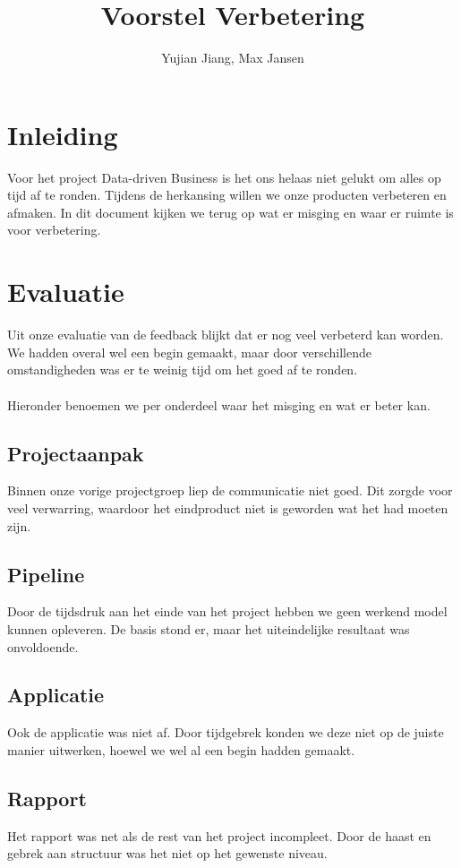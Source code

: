 \documentclass{article}
\title{Voorstel Verbetering}
\author{Yujian Jiang, Max Jansen}
\begin{document}
\maketitle

\newpage
\tableofcontents

\newpage
\section{Inleiding}
Voor het project Data-driven Business is het ons helaas niet gelukt om alles op tijd af te ronden. Tijdens de herkansing willen we onze producten verbeteren en afmaken. In dit document kijken we terug op wat er misging en waar er ruimte is voor verbetering.

\newpage
\section{Evaluatie}
Uit onze evaluatie van de feedback blijkt dat er nog veel verbeterd kan worden. We hadden overal wel een begin gemaakt, maar door verschillende omstandigheden was er te weinig tijd om het goed af te ronden.
\\ \\
Hieronder benoemen we per onderdeel waar het misging en wat er beter kan.

\subsection{Projectaanpak}
Binnen onze vorige projectgroep liep de communicatie niet goed. Dit zorgde voor veel verwarring, waardoor het eindproduct niet is geworden wat het had moeten zijn.

\subsection{Pipeline}
Door de tijdsdruk aan het einde van het project hebben we geen werkend model kunnen opleveren. De basis stond er, maar het uiteindelijke resultaat was onvoldoende.

\subsection{Applicatie}
Ook de applicatie was niet af. Door tijdgebrek konden we deze niet op de juiste manier uitwerken, hoewel we wel al een begin hadden gemaakt.

\subsection{Rapport}
Het rapport was net als de rest van het project incompleet. Door de haast en gebrek aan structuur was het niet op het gewenste niveau.
\end{document}
